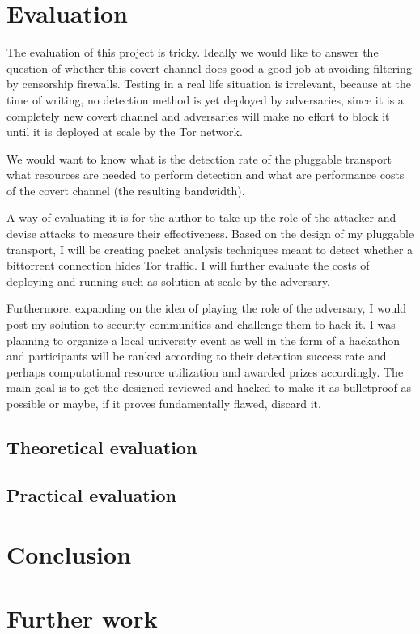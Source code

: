 \documentclass[11pt]{article} %
\begin{document}
\section{Evaluation}

The evaluation of this project is tricky. Ideally we would like to answer the question of whether this covert channel does good a good job at avoiding filtering by censorship firewalls. Testing in a real life situation is irrelevant, because at the time of writing, no detection method is yet deployed by adversaries, since it is a completely new covert channel and adversaries will make no effort to block it until it is deployed at scale by the Tor network.

We would want to know what is the detection rate of the pluggable transport what resources are needed to perform detection and what are performance costs of the covert channel (the resulting bandwidth).

A way of evaluating it is for the author to take up the role of the attacker and devise attacks to measure their effectiveness. Based on the design of my pluggable transport, I will be creating packet analysis techniques meant to detect whether a bittorrent connection hides Tor traffic. I will further evaluate the costs of deploying and running such as solution at scale by the adversary. 

Furthermore, expanding on the idea of playing the role of the adversary, I would post my solution to security communities and challenge them to hack it. I was planning to organize a local university event as well in the form of a hackathon and participants will be ranked according to their detection success rate and perhaps computational resource utilization and awarded prizes accordingly. The main goal is to get the designed reviewed and hacked to make it as bulletproof as possible or maybe, if it proves fundamentally flawed, discard it.

\subsection{Theoretical evaluation}

\subsection{Practical evaluation}

\section{Conclusion}

\section{Further work}




\newpage

\end{document}

